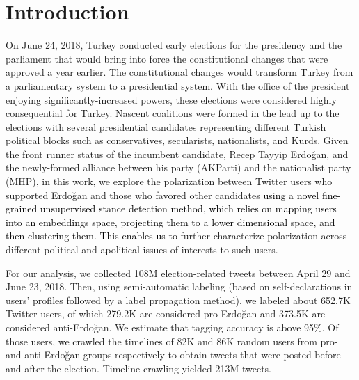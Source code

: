 \documentclass[letterpaper]{article} \usepackage{aaai20}  \usepackage{times}  \usepackage{stackengine}
\newcommand{\kareem}{\textcolor{black}}
\begin{document}
\vspace{-0.4cm}
\section{Introduction}
On June 24, 2018, Turkey conducted early elections for the presidency and the parliament that would bring into force the constitutional changes that were approved a year earlier.
The constitutional changes would transform Turkey from a parliamentary system to a presidential system. With the office of the president enjoying significantly-increased powers, these elections were considered highly consequential for Turkey. Nascent coalitions were formed in the lead up to the elections with several presidential candidates representing different Turkish political blocks such as conservatives, secularists, nationalists, and Kurds. Given the front runner status of the incumbent candidate, Recep Tayyip Erdo\u{g}an, and the newly-formed alliance between his party (AKParti) and the nationalist party (MHP), in this work, we explore the polarization between Twitter users who supported Erdo\u{g}an and those who favored other candidates \kareem{using a novel fine-grained unsupervised stance detection method, which relies on mapping users into an embeddings space, projecting them to a lower dimensional space, and then clustering them. This enables us to} further characterize polarization across different political and apolitical issues of interests to such users. 

For our analysis, we collected 108M election-related tweets between April 29 and June 23, 2018. Then, using semi-automatic labeling (based on self-declarations in users' profiles followed by a label propagation method), we labeled about 652.7K Twitter users, of which 279.2K are considered pro-Erdo\u{g}an and 373.5K are considered anti-Erdo\u{g}an. We estimate that tagging accuracy is above 95\%. Of those users, we crawled the timelines of 82K and 86K random users from pro- and anti-Erdo\u{g}an groups respectively to obtain tweets that were posted before and after the election. Timeline crawling yielded 213M tweets.
\end{document}
